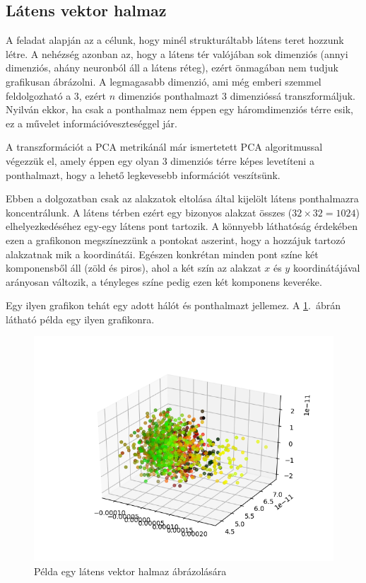 \subsection{Látens vektor halmaz}

A feladat alapján az a célunk, hogy minél strukturáltabb látens teret hozzunk létre. A nehézség azonban az, hogy a látens tér valójában sok dimenziós (annyi dimenziós, ahány neuronból áll a látens réteg), ezért önmagában nem tudjuk grafikusan ábrázolni. A legmagasabb dimenzió, ami még emberi szemmel feldolgozható a $3$, ezért $n$ dimenziós ponthalmazt $3$ dimenzióssá transzformáljuk. Nyilván ekkor, ha csak a ponthalmaz nem éppen egy háromdimenziós térre esik, ez a művelet információveszteséggel jár.

A transzformációt a PCA metrikánál már ismertetett PCA algoritmussal végezzük el, amely éppen egy olyan $3$ dimenziós térre képes levetíteni a ponthalmazt, hogy a lehető legkevesebb információt veszítsünk.

Ebben a dolgozatban csak az alakzatok eltolása által kijelölt látens ponthalmazra koncentrálunk. A látens térben ezért egy bizonyos alakzat összes ($32\times32=1024$) elhelyezkedéséhez egy-egy látens pont tartozik. A könnyebb láthatóság érdekében ezen a grafikonon megszínezzünk a pontokat aszerint, hogy a hozzájuk tartozó alakzatnak mik a koordinátái. Egészen konkrétan minden pont színe két komponensből áll (zöld és piros), ahol a két szín az alakzat $x$ és $y$ koordinátájával arányosan változik, a tényleges színe pedig ezen két komponens keveréke. 

Egy ilyen grafikon tehát egy adott hálót és ponthalmazt jellemez. A \ref{m3D}.~ábrán látható példa egy ilyen grafikonra.

\begin{figure}[h!]
\begin{center} 
	\begin{center}
	\includegraphics[width=1\linewidth]{3D-example.png}
	\end{center}
	
  \caption{Példa egy látens vektor halmaz ábrázolására}\label{m3D}
\end{center}
\end{figure}

